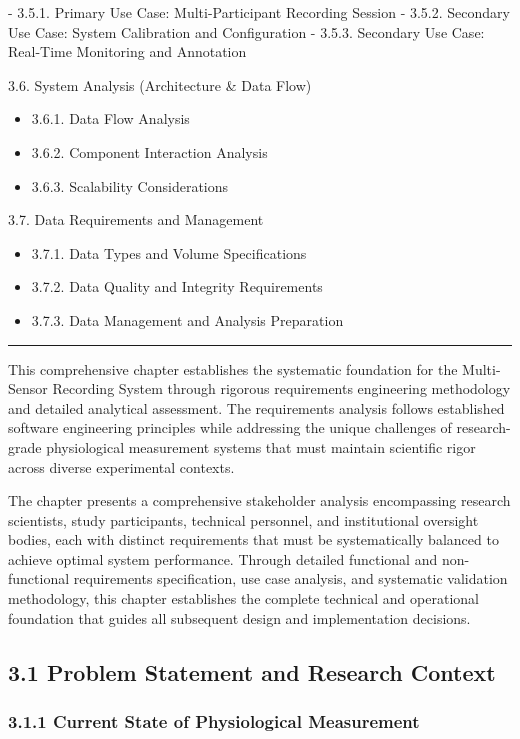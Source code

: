 \documentclass[12pt,a4paper]{article}
\begin{document}
-
3.5.1. Primary Use Case: Multi-Participant Recording Session
-
3.5.2. Secondary Use Case: System Calibration and Configuration
-
3.5.3. Secondary Use Case: Real-Time Monitoring and Annotation

3.6. System Analysis (Architecture \& Data Flow)

\begin{itemize}
\item 3.6.1. Data Flow Analysis
\item 3.6.2. Component Interaction Analysis
\item 3.6.3. Scalability Considerations

\end{itemize}
3.7. Data Requirements and Management

\begin{itemize}
\item 3.7.1. Data Types and Volume Specifications
\item 3.7.2. Data Quality and Integrity Requirements
\item 3.7.3. Data Management and Analysis Preparation

\end{itemize}
\hrule

This comprehensive chapter establishes the systematic foundation for the Multi-Sensor Recording System through rigorous
requirements engineering methodology and detailed analytical assessment. The requirements analysis follows established
software engineering principles while addressing the unique challenges of research-grade physiological measurement
systems that must maintain scientific rigor across diverse experimental contexts.

The chapter presents a comprehensive stakeholder analysis encompassing research scientists, study participants,
technical personnel, and institutional oversight bodies, each with distinct requirements that must be systematically
balanced to achieve optimal system performance. Through detailed functional and non-functional requirements
specification, use case analysis, and systematic validation methodology, this chapter establishes the complete technical
and operational foundation that guides all subsequent design and implementation decisions.

\subsection{3.1 Problem Statement and Research Context}

\subsubsection{3.1.1 Current State of Physiological Measurement}
\end{document}
